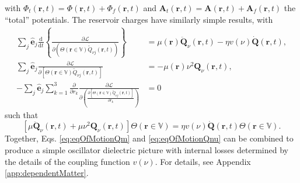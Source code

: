 \documentclass{article}
\begin{document}
with $\Phi_t(\mathbf{r},t) = \Phi(\mathbf{r},t) + \Phi_f(\mathbf{r},t)$ and $\mathbf{A}_t(\mathbf{r},t) = \mathbf{A}(\mathbf{r},t) + \mathbf{A}_f(\mathbf{r},t)$ the ``total'' potentials. The reservoir charges have similarly simple results, with
\begin{equation}
\begin{split}
\sum_j\hat{\mathbf{e}}_j\frac{\mathrm{d}}{\mathrm{d}t}\left\{\frac{\partial \mathcal{L}}{\partial \left(\Theta(\mathbf{r}\in\mathbb{V})\dot{\tilde{Q}}_{\nu j}(\mathbf{r},t)\right)}\right\} &= \mu(\mathbf{r})\ddot{\mathbf{Q}}_\nu(\mathbf{r},t) -  \eta v(\nu)\dot{\mathbf{Q}}(\mathbf{r},t),\\
\sum_j\hat{\mathbf{e}}_j\frac{\partial \mathcal{L}}{\partial \left[\Theta(\mathbf{r}\in\mathbb{V})\tilde{Q}_{\nu j}(\mathbf{r},t)\right]} &= -\mu(\mathbf{r})\nu^2\mathbf{Q}_\nu(\mathbf{r},t),\\
-\sum_j\hat{\mathbf{e}}_j\sum_{k = 1}^3\frac{\partial}{\partial r_k}\frac{\partial \mathcal{L}}{\partial\!\left(\frac{\partial \left[\Theta(\mathbf{r}\in\mathbb{V})\tilde{Q}_{\nu j}(\mathbf{r},t)\right]}{\partial r_k}\right)} &= 0
\end{split}
\end{equation}
such that
\begin{equation}\label{eq:eqOfMotionQnu}
\left[\mu\ddot{\mathbf{Q}}_\nu(\mathbf{r},t) + \mu\nu^2\mathbf{Q}_\nu(\mathbf{r},t)\right]\Theta(\mathbf{r}\in\mathbb{V}) =  \eta v(\nu)\dot{\mathbf{Q}}(\mathbf{r},t)\Theta(\mathbf{r}\in\mathbb{V}).
\end{equation}
Together, Eqs. \eqref{eq:eqOfMotionQm} and \eqref{eq:eqOfMotionQnu} can be combined to produce a simple oscillator dielectric picture with internal losses determined by the details of the coupling function $ v(\nu)$. For details, see Appendix \ref{app:dependentMatter}.
\end{document}
